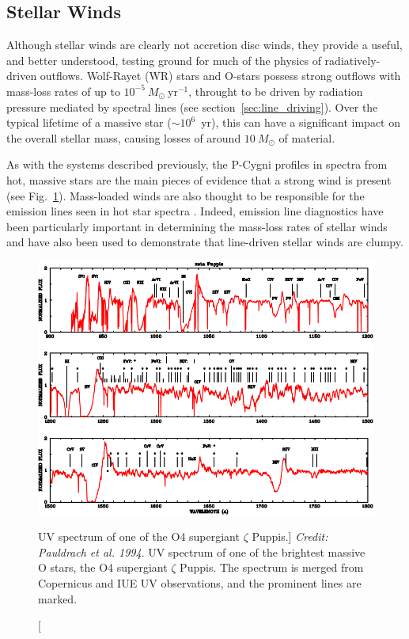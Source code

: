 \subsection{Stellar Winds}

\label{sec:stellar_winds}

Although stellar winds are clearly not accretion disc winds,
they provide a useful, and better understood, testing ground for much
of the physics of radiatively-driven outflows. 
Wolf-Rayet (WR) stars and O-stars possess strong outflows with mass-loss rates
of up to $10^{-5}~M_\odot~$yr$^{-1}$, throught to be driven by radiation pressure
mediated by spectral lines (see section~\ref{sec:line_driving}). 
Over the typical lifetime of a massive
star ($\sim10^6$~yr), this can have a significant impact on the overall stellar mass,
causing losses of around $10~M_\odot$ of material. 

As with the systems described previously, the P-Cygni profiles
in spectra from hot, massive stars are the main pieces of evidence that
a strong wind is present (see Fig.~\ref{fig:hot_star_wind}). Mass-loaded
winds are also thought to be responsible for the emission lines 
seen in hot star spectra \citep[e.g.][]{pauldrach1994}. Indeed, emission
line diagnostics have been particularly important in determining
the mass-loss rates of stellar winds and have also been used to demonstrate 
that line-driven stellar winds are clumpy. 

\begin{figure}
\centering
\includegraphics[width=1.0\textwidth]{figures/02-outflows/hot_star_wind.png}
\caption
[UV spectrum of one of the O4 supergiant $\zeta$ Puppis.]
{
{\sl Credit: Pauldrach et al. 1994}. 
UV spectrum of one of the brightest massive O stars, 
the O4 supergiant $\zeta$ Puppis. The spectrum is merged from 
Copernicus and IUE UV observations, and the prominent lines are 
marked.
} 
\label{fig:hot_star_wind}
\end{figure}

